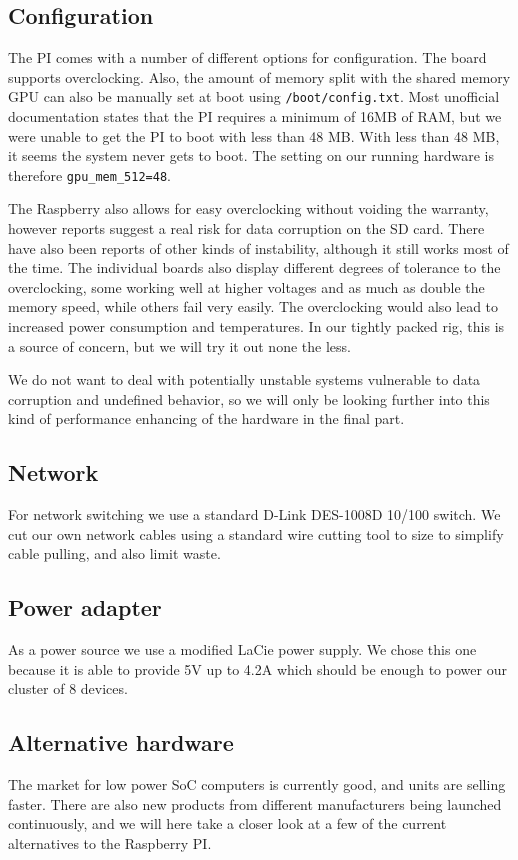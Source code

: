 \subsection{Configuration}
The PI comes with a number of different options for configuration. The board supports overclocking. Also, the amount of memory split with the shared memory GPU can also be manually set at boot using {\tt /boot/config.txt}.
Most unofficial documentation states that the PI requires a minimum of 16MB of RAM, but we were unable to get the PI to boot with less than 48 MB. 
With less than 48 MB, it seems the system never gets to boot.
The setting on our running hardware is therefore {\tt gpu\_mem\_512=48}.

The Raspberry also allows for easy overclocking without voiding the warranty, however reports suggest a real risk for data corruption on the SD card. There have also been reports of other kinds of instability, although it still works most of the time. The individual boards also display different degrees of tolerance to the overclocking, some working well at higher voltages and as much as double the memory speed, while others fail very easily.
The overclocking would also lead to increased power consumption and temperatures. In our tightly packed rig, this is a source of concern, but we will try it out none the less.

We do not want to deal with potentially unstable systems vulnerable to data corruption and undefined behavior, so we will only be looking further into this kind of performance enhancing of the hardware in the final part.

\subsection{Network}
For network switching we use a standard D-Link DES-1008D 10/100 switch. We cut our own network cables using a standard wire cutting tool to size to simplify cable pulling, and also limit waste.

\subsection{Power adapter}
As a power source we use a modified LaCie power supply. We chose this one because it is able to provide 5V up to 4.2A which should be enough to power our cluster of 8 devices.

\subsection{Alternative hardware}
The market for low power SoC computers is currently good, and units are selling faster\cite{growing_market}.
There are also new products from different manufacturers being launched continuously, and we will here take a closer look at a few of the current alternatives to the Raspberry PI.

